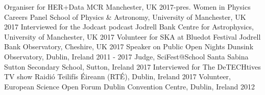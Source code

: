 \begin{cvpress}
   \cvpres
   {Organiser for HER+Data MCR}
    {Manchester, UK}
    {2017-pres.}
   \cvpres
   	{Women in Physics Careers Panel}
    {School of Physics \& Astronomy, University of Manchester, UK}
    {2017}
   \cvpres
   {Interviewed for the Jodcast podcast}
    {Jodrell Bank Centre for Astrophysics, University of Manchester, UK}
    {2017}
   \cvpres
   {Volunteer for SKA at Bluedot Festival}
    {Jodrell Bank Observatory, Cheshire, UK}
    {2017}
   \cvpres
   {Speaker on Public Open Nights}
    {Dunsink Observatory, Dublin, Ireland}
    {2011 - 2017}
   \cvpres
   	{Judge, SciFest@School}
    {Santa Sabina Sutton Secondary School, Sutton, Ireland}
    {2017}
   \cvpres
   	{Interviewed for The DeTECHtives TV show}
    {Raidi{\'o} Teilif{\'i}s {\'E}ireann (RT{\'E}), Dublin, Ireland}
    {2017}
   \cvpres
   	{Volunteer, European Science Open Forum}
    {Dublin Convention Centre, Dublin, Ireland}
    {2012}
\end{cvpress}



